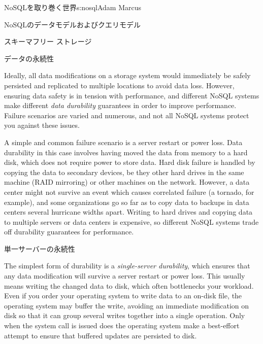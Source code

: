 \begin{aosachapter}{NoSQLを取り巻く世界}{s:nosql}{Adam Marcus}
\begin{aosasect1}{NoSQLのデータモデルおよびクエリモデル}
\begin{aosasect2}{スキーマフリー ストレージ}
\end{aosasect2}

\end{aosasect1}

\begin{aosasect1}{データの永続性}

Ideally, all data modifications on a storage system would immediately
be safely persisted and replicated to multiple locations to avoid data
loss.  However, ensuring data safety is in tension with performance,
and different NoSQL systems make different \emph{data durability}
guarantees in order to improve performance.  Failure scenarios are
varied and numerous, and not all NoSQL systems protect you against
these issues.

A simple and common failure scenario is a server restart or power
loss.  Data durability in this case involves having moved the data
from memory to a hard disk, which does not require power to store
data.  Hard disk failure is handled by copying the data to secondary
devices, be they other hard drives in the same machine (RAID
mirroring) or other machines on the network.  However, a data center
might not survive an event which causes correlated failure (a tornado, for example), and some
organizations go so far as to copy data to backups in data centers
several hurricane widths apart. Writing to hard drives and copying
data to multiple servers or data centers is expensive, so different
NoSQL systems trade off durability guarantees for performance.

\begin{aosasect2}{単一サーバーの永続性}

The simplest form of durability is a \emph{single-server durability},
which ensures that any data modification will survive a server restart
or power loss.  This usually means writing the changed data to disk,
which often bottlenecks your workload.  Even if you order your
operating system to write data to an on-disk file, the operating
system may buffer the write, avoiding an immediate modification on
disk so that it can group several writes together into a single
operation.  Only when the  system call is issued does the
operating system make a best-effort attempt to ensure that buffered
updates are persisted to disk.


\end{aosasect2}
\end{aosasect1}
\end{aosachapter}
